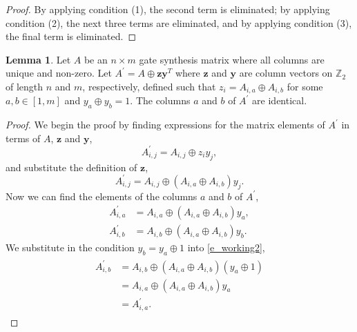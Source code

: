 \documentclass[titlepage]{article}
\theoremstyle{definition}
\theoremstyle{problem}
\theoremstyle{lemma}
\newtheorem{lemma}{Lemma}[section]
\begin{document}
\begin{proof}
			By applying condition (1), the second term is eliminated; by applying condition (2), the next three terms are eliminated, and by applying condition (3), the final term is eliminated.
		\end{proof}
	
		\theoremstyle{lemma}
		\begin{lemma}{}
			\label{lem2}
			Let $A$ be an $n\times m$ gate synthesis matrix where all columns are unique and non-zero. Let $A^\prime = A \oplus \mathbf{z}\mathbf{y}^T$ where $\mathbf{z}$ and $\mathbf{y}$ are column vectors on $\mathbb{Z}_2$ of length $n$ and $m$, respectively, defined such that $z_i = A_{i,a} \oplus A_{i,b}$ for some $a,b\in \left[1,m\right]$ and $y_a \oplus y_b = 1$. The columns $a$ and $b$ of $A^\prime$ are identical.
		\end{lemma}
		\begin{proof}
			We begin the proof by finding expressions for the matrix elements of $A^\prime$ in terms of $A$, $\mathbf{z}$ and $\mathbf{y}$,
			\begin{equation}
			A^\prime_{i,j} = A_{i,j} \oplus z_i y_j,
			\end{equation}
			and substitute the definition of $\mathbf{z}$,
			\begin{equation}
			A^\prime_{i,j} = A_{i,j} \oplus (A_{i,a}\oplus A_{i,b}) y_j.
			\end{equation}
			Now we can find the elements of the columns $a$ and $b$ of $A^\prime$,
			\begin{align}
			A^\prime_{i,a} &= A_{i,a} \oplus (A_{i,a}\oplus A_{i,b}) y_a,\\
			A^\prime_{i,b} &= A_{i,b} \oplus (A_{i,a}\oplus A_{i,b}) y_b.
			\label{e_working2}
			\end{align}
			We substitute in the condition $y_b = y_a \oplus 1$ into \ref{e_working2},
			\begin{align}
			\begin{split}
			A^\prime_{i,b} &= A_{i,b} \oplus (A_{i,a}\oplus A_{i,b}) (y_a \oplus 1) \\
			&= A_{i,a} \oplus (A_{i,a}\oplus A_{i,b})y_a \\
			& = A^\prime_{i,a}.
			\end{split}			
			\end{align}
		\end{proof}
		
\end{document}
